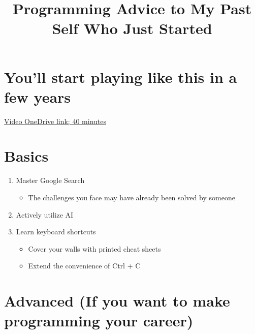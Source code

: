 \documentclass[a4paper,11pt]{article}
\title{Programming Advice to My Past Self Who Just Started}
\author{}
\date{}
\begin{document}
\maketitle

\section{You'll start playing like this in a few years}
\href{https://photos.onedrive.com/share/12F1169924695EF9!250373?cid=12F1169924695EF9&resId=12F1169924695EF9!250373&authkey=!AEcanzCk1fx4cYI&ithint=video&e=TjlgN1}{Video OneDrive link; 40 minutes}

\section{Basics}
\begin{enumerate}
    \item Master Google Search
    \begin{itemize}
        \item The challenges you face may have already been solved by someone
    \end{itemize}
    \item Actively utilize AI
    \item Learn keyboard shortcuts
    \begin{itemize}
        \item Cover your walls with printed cheat sheets
        \item Extend the convenience of Ctrl + C
    \end{itemize}
\end{enumerate}

\section{Advanced (If you want to make programming your career)}
\end{document}
